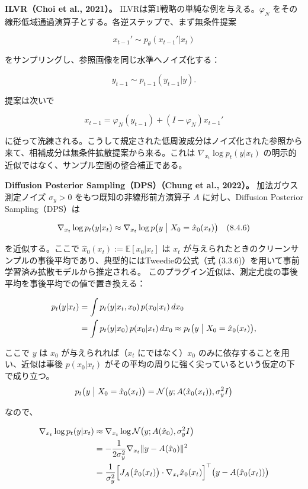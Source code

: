 \textbf{ILVR（Choi et al., 2021）。} ILVRは第1戦略の単純な例を与える。$\varphi_N$ をその線形低域通過演算子とする。各逆ステップで、まず無条件提案

\[
x_{t-1}'\sim p_\theta(x_{t-1}'|x_t)
\]


をサンプリングし、参照画像を同じ水準へノイズ化する：

\[
y_{t-1}\sim p_{t-1}(y_{t-1}|y).
\]


提案は次いで

\[
x_{t-1}=\varphi_N(y_{t-1})+(I-\varphi_N)x_{t-1}'
\]


に従って洗練される。こうして規定された低周波成分はノイズ化された参照から来て、相補成分は無条件拡散提案から来る。これは $\nabla_{x_t}\log p_t(y|x_t)$ の明示的近似ではなく、サンプル空間の整合補正である。

\textbf{Diffusion Posterior Sampling（DPS）（Chung et al., 2022）。} 加法ガウス測定ノイズ $\sigma_y>0$ をもつ既知の非線形前方演算子 $A$ に対し、Diffusion Posterior Sampling（DPS）は

\[
\nabla_{x_t}\log p_t(y|x_t)\approx\nabla_{x_t}\log p\bigl(y\bigm|X_0=\hat{x}_0(x_t)\bigr) \quad (8.4.6)
\]


を近似する。ここで $\hat{x}_0(x_t):=\mathbb{E}[x_0|x_t]$ は $x_t$ が与えられたときのクリーンサンプルの事後平均であり、典型的にはTweedieの公式（式 (3.3.6)）を用いて事前学習済み拡散モデルから推定される。
このプラグイン近似は、測定尤度の事後平均を事後平均での値で置き換える：

\begin{align*}
\begin{aligned}
p_t(y|x_t)
&=\int p_t(y|x_t,x_0)\,p(x_0|x_t)\,dx_0 \\
&=\int p_t(y|x_0)\,p(x_0|x_t)\,dx_0
\approx p_t\bigl(y\bigm|X_0=\hat{x}_0(x_t)\bigr),
\end{aligned}
\end{align*}


ここで $y$ は $x_0$ が与えられれば（$x_t$ にではなく）$x_0$ のみに依存することを用い、近似は事後 $p(x_0|x_t)$ がその平均の周りに強く尖っているという仮定の下で成り立つ。
\[
p_t\bigl(y\bigm|X_0=\hat{x}_0(x_t)\bigr)=\mathcal{N}\bigl(y;A(\hat{x}_0(x_t)),\sigma_y^2 I\bigr)
\]

なので、

\begin{align*}
\begin{aligned}
\nabla_{x_t}\log p_t(y|x_t)
&\approx\nabla_{x_t}\log\mathcal{N}\bigl(y;A(\hat{x}_0),\sigma_y^2 I\bigr) \\
&=-\frac{1}{2\sigma_y^2}\nabla_{x_t}\|y-A(\hat{x}_0)\|^2 \\
&=\frac{1}{\sigma_y^2}\Bigl[J_A\bigl(\hat{x}_0(x_t)\bigr)\cdot\nabla_{x_t}\hat{x}_0(x_t)\Bigr]^\top\bigl(y-A(\hat{x}_0(x_t))\bigr)
\end{aligned}
\end{align*}


